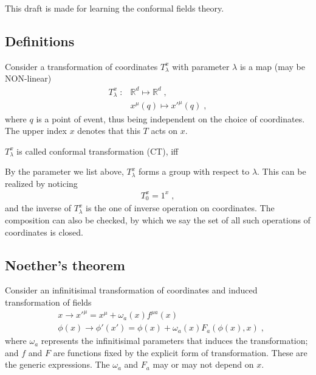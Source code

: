 \documentclass[]{article}
\begin{document}
This draft is made for learning the conformal fields theory.

\subsection{Definitions}

Consider a transformation of coordinates $T_{\lambda}^x$ with parameter $\lambda$ is a map (may be NON-linear)
\begin{align*}
  T_{\lambda}^x
  \;:
  &
  \mathbb{R}^d \mapsto \mathbb{R}^d \;,
  \\
  &
  x^{\mu}(q) \mapsto x'^{\mu}(q)
  \;,
\end{align*}
where $q$ is a point of event, thus being independent on the choice of coordinates. The upper index $x$ denotes that this $T$ acts on $x$.

\begin{definition}
  \label{definition: conformal transformation}
  $T_{\lambda}^x$ is called conformal transformation (CT), iff
\end{definition}

By the parameter we list above, $T_{\lambda}^x$ forms a group with respect to $\lambda$. This can be realized by noticing
\begin{align*}
  T_{0}^x = 1^x
  \;,
\end{align*}
and the inverse of $T_{\lambda}^x$ is the one of inverse operation on coordinates. The composition can also be checked, by which we say the set of all such operations of coordinates is closed.
\begin{definition}
  \label{definition: conformal group}
\end{definition}


\subsection{Noether's theorem}

Consider an infinitisimal transformation of coordinates and induced transformation of fields
\begin{align}
  &
  x \rightarrow x'^{\mu} =
    x^{\mu} + \omega_a(x) f^{\mu a}(x)
  \\
  &
  \phi(x) \rightarrow \phi'(x')
    = \phi(x) + \omega_a(x) F_a \left( \phi(x), x \right)
  \;,
\end{align}
where $\omega_a$ represents the infinitisimal parameters that induces the transformation; and $f$ and $F$ are functions fixed by the explicit form of transformation. These are the generic expressions. The $\omega_a$ and $F_a$ may or may not depend on $x$.
\end{document}
